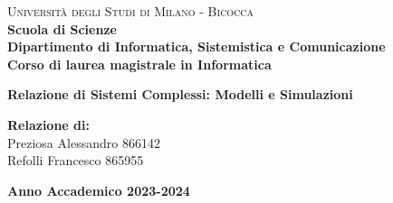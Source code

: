 \documentclass[a4paper,11pt,oneside, table]{article}
\begin{document}
    \begin{titlepage}
        \noindent
        \begin{minipage}[t]{0.19\textwidth}
        \end{minipage}
        \begin{minipage}[t]{0.81\textwidth}
        {
                {\textsc{Università degli Studi di Milano - Bicocca}} \\
                \textbf{Scuola di Scienze} \\
                \textbf{Dipartimento di Informatica, Sistemistica e Comunicazione} \\
                \textbf{Corso di laurea magistrale in Informatica} \\
                \par
        }
        \end{minipage}
    	\vspace{40mm}
    	\begin{center}
            {\LARGE{
                    \textbf{Relazione di Sistemi Complessi: Modelli e Simulazioni}
                    \par
            }}
        \end{center}
        
        \vspace{50mm}
        
        \vspace{15mm}

        \begin{flushright}
            {\large \textbf{Relazione di:}} \\
            \large{Preziosa Alessandro} \large{866142} \\
            \large{Refolli Francesco} \large{865955}
        \end{flushright}
        
        \vspace{40mm}
        \begin{center}
            {\large{\bf Anno Accademico 2023-2024}}
        \end{center}
        \restoregeometry
    \end{titlepage}
\end{document}
